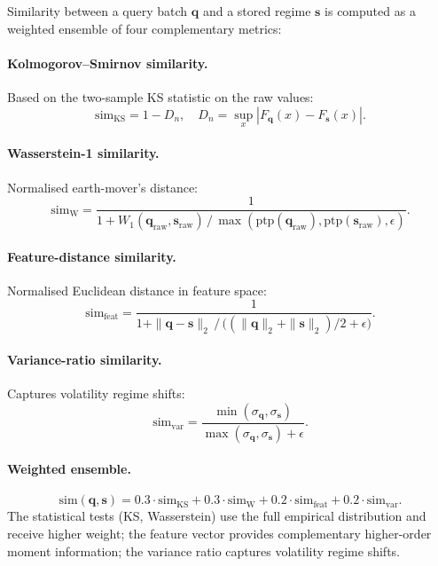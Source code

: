 \documentclass[11pt,a4paper]{article}
\begin{document}
Similarity between a query batch $\mathbf{q}$ and a stored regime $\mathbf{s}$ is computed as a weighted ensemble of four complementary metrics:

\paragraph{Kolmogorov--Smirnov similarity.} Based on the two-sample KS statistic on the raw values:
\begin{equation}
  \text{sim}_{\text{KS}} = 1 - D_n, \quad D_n = \sup_x |F_{\mathbf{q}}(x) - F_{\mathbf{s}}(x)|.
\end{equation}

\paragraph{Wasserstein-1 similarity.} Normalised earth-mover's distance:
\begin{equation}
  \text{sim}_{\text{W}} = \frac{1}{1 + W_1(\mathbf{q}_{\text{raw}}, \mathbf{s}_{\text{raw}}) \,/\, \max(\text{ptp}(\mathbf{q}_{\text{raw}}), \text{ptp}(\mathbf{s}_{\text{raw}}), \epsilon)}.
\end{equation}

\paragraph{Feature-distance similarity.} Normalised Euclidean distance in feature space:
\begin{equation}
  \text{sim}_{\text{feat}} = \frac{1}{1 + \|\mathbf{q} - \mathbf{s}\|_2 \,/\, \big((\|\mathbf{q}\|_2 + \|\mathbf{s}\|_2)/2 + \epsilon\big)}.
\end{equation}

\paragraph{Variance-ratio similarity.} Captures volatility regime shifts:
\begin{equation}
  \text{sim}_{\text{var}} = \frac{\min(\sigma_{\mathbf{q}}, \sigma_{\mathbf{s}})}{\max(\sigma_{\mathbf{q}}, \sigma_{\mathbf{s}}) + \epsilon}.
\end{equation}

\paragraph{Weighted ensemble.}
\begin{equation}
  \text{sim}(\mathbf{q}, \mathbf{s}) = 0.3 \cdot \text{sim}_{\text{KS}} + 0.3 \cdot \text{sim}_{\text{W}} + 0.2 \cdot \text{sim}_{\text{feat}} + 0.2 \cdot \text{sim}_{\text{var}}.
  \label{eq:ensemble}
\end{equation}
The statistical tests (KS, Wasserstein) use the full empirical distribution and receive higher weight; the feature vector provides complementary higher-order moment information; the variance ratio captures volatility regime shifts.
\end{document}
